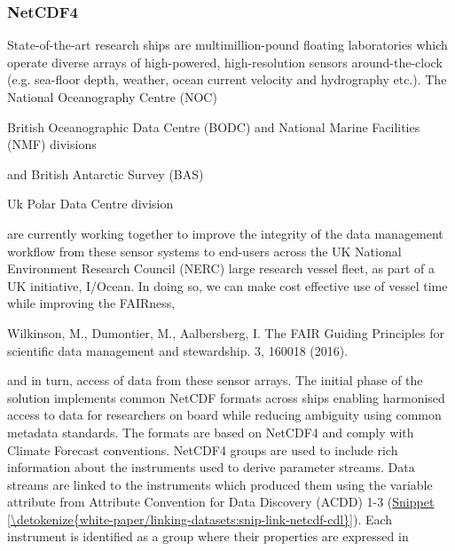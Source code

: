 \documentclass[a4paper,10pt,english]{sphinxmanual}
\begin{document}
\subsubsection{NetCDF4}
\label{\detokenize{white-paper/linking-datasets:netcdf4}}\label{\detokenize{white-paper/linking-datasets:section-1}}
State-of-the-art research ships are multimillion-pound floating
laboratories which operate diverse arrays of high-powered,
high-resolution sensors around-the-clock (e.g. sea-floor depth, weather,
ocean current velocity and hydrography etc.). The National Oceanography
Centre (NOC)%
\begin{footnote}[1]\sphinxAtStartFootnote
British Oceanographic Data Centre (BODC) and National Marine
Facilities (NMF) divisions
%
\end{footnote} and British Antarctic Survey (BAS)%
\begin{footnote}[2]\sphinxAtStartFootnote
Uk Polar Data Centre division
%
\end{footnote}
are currently working together to improve the integrity of the data
management workflow from these sensor systems to end-users across the UK
National Environment Research Council (NERC) large research vessel
fleet, as part of a UK initiative, I/Ocean. In doing so, we can make
cost effective use of vessel time while improving the
FAIRness,%
\begin{footnote}[3]\sphinxAtStartFootnote
Wilkinson, M., Dumontier, M., Aalbersberg, I.  The FAIR
Guiding Principles for scientific data management and stewardship.
 3, 160018 (2016). 
%
\end{footnote} and in turn, access of data from these
sensor arrays. The initial phase of the solution implements common
NetCDF formats across ships enabling harmonised access to data for
researchers on board while reducing ambiguity using common metadata
standards. The formats are based on NetCDF4 and comply with Climate
Forecast conventions. NetCDF4 groups are used to include rich
information about the instruments used to derive parameter streams. Data
streams are linked to the instruments which produced them using the
variable attribute  from Attribute Convention for Data
Discovery (ACDD) 1-3 (\hyperref[\detokenize{white-paper/linking-datasets:snip-link-netcdf-cdl}]{Snippet \ref{\detokenize{white-paper/linking-datasets:snip-link-netcdf-cdl}}}). Each instrument
is identified as a group where their properties are expressed in
\end{document}
